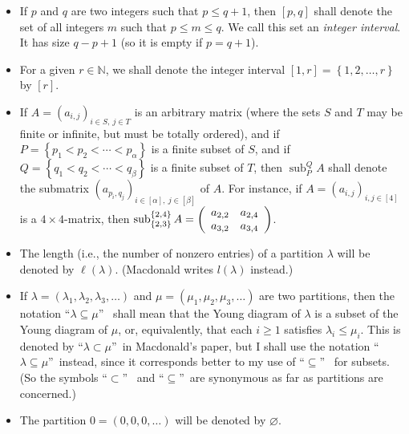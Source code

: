 \documentclass[numbers=enddot,12pt,final,onecolumn,notitlepage]{scrartcl}%
\theoremstyle{definition}
\begin{document}
\begin{itemize}
\item If $p$ and $q$ are two integers such that $p\leq q+1$, then $\left[
p,q\right]  $ shall denote the set of all integers $m$ such that $p\leq m\leq
q$. We call this set an \emph{integer interval}. It has size $q-p+1$ (so it is
empty if $p=q+1$).

\item For a given $r\in\mathbb{N}$, we shall denote the integer interval
$\left[  1,r\right]  =\left\{  1,2,\ldots,r\right\}  $ by $\left[  r\right]  $.

\item If $A=\left(  a_{i,j}\right)  _{i\in S,\ j\in T}$ is an arbitrary matrix
(where the sets $S$ and $T$ may be finite or infinite, but must be totally
ordered), and if $P=\left\{  p_{1}<p_{2}<\cdots<p_{\alpha}\right\}  $ is a
finite subset of $S$, and if $Q=\left\{  q_{1}<q_{2}<\cdots<q_{\beta}\right\}
$ is a finite subset of $T$, then $\operatorname*{sub}\nolimits_{P}^{Q}A$
shall denote the submatrix $\left(  a_{p_{i},q_{j}}\right)  _{i\in\left[
\alpha\right]  ,\ j\in\left[  \beta\right]  }$ of $A$. For instance, if
$A=\left(  a_{i,j}\right)  _{i,j\in\left[  4\right]  }$ is a $4\times
4$-matrix, then $\operatorname*{sub}\nolimits_{\left\{  2,3\right\}
}^{\left\{  2,4\right\}  }A=\left(
\begin{array}
[c]{cc}%
a_{2,2} & a_{2,4}\\
a_{3,2} & a_{3,4}%
\end{array}
\right)  $.

\item The length (i.e., the number of nonzero entries) of a partition
$\lambda$ will be denoted by $\ell\left(  \lambda\right)  $. (Macdonald writes
$l\left(  \lambda\right)  $ instead.)

\item If $\lambda=\left(  \lambda_{1},\lambda_{2},\lambda_{3},\ldots\right)  $
and $\mu=\left(  \mu_{1},\mu_{2},\mu_{3},\ldots\right)  $ are two partitions,
then the notation \textquotedblleft$\lambda\subseteq\mu$\textquotedblright%
\ shall mean that the Young diagram of $\lambda$ is a subset of the Young
diagram of $\mu$, or, equivalently, that each $i\geq1$ satisfies $\lambda
_{i}\leq\mu_{i}$. This is denoted by \textquotedblleft$\lambda\subset\mu
$\textquotedblright\ in Macdonald's paper, but I shall use the notation
\textquotedblleft$\lambda\subseteq\mu$\textquotedblright\ instead, since it
corresponds better to my use of \textquotedblleft$\subseteq$\textquotedblright%
\ for subsets. (So the symbols \textquotedblleft$\subset$\textquotedblright%
\ and \textquotedblleft$\subseteq$\textquotedblright\ are synonymous as far as
partitions are concerned.)

\item The partition $0=\left(  0,0,0,\ldots\right)  $ will be denoted by
$\varnothing$.
\end{itemize}
\end{document}
